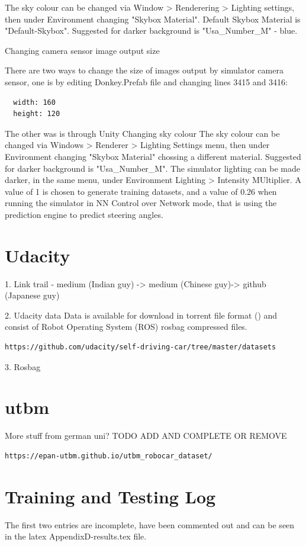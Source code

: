 The sky colour can be changed via Window > Renderering > Lighting settings, then under Environment changing "Skybox Material". Default Skybox Material is "Default-Skybox". Suggested for darker background is "Usa\_Number\_M" - blue.

Changing camera sensor image output size

There are two ways to change the size of images output by simulator camera sensor, one is by editing Donkey.Prefab file and changing lines 3415 and 3416:
\begin{verbatim}
  width: 160
  height: 120
\end{verbatim}
The other was is through Unity
Changing sky colour
The sky colour can be changed via Windows > Renderer > Lighting Settings menu, then under Environment changing "Skybox Material" chossing a different material.  Suggested for darker background is "Usa\_Number\_M".
The simulator lighting can be made darker, in the same menu, under Environment Lighting > Intensity MUltiplier. A value of 1 is chosen to generate training datasets, and a value of 0.26 when running the simulator in NN Control over Network mode, that is using the prediction engine to predict steering angles.
\section{Udacity}

1. Link trail - medium (Indian guy) -> medium (Chinese guy)-> github (Japanese guy)  
  
2. Udacity data  
Data is available for download in torrent file format (\cite{torrentCite}) and consist of Robot Operating System (ROS) rosbag compressed files.

\begin{verbatim}
https://github.com/udacity/self-driving-car/tree/master/datasets
\end{verbatim}
3. Rosbag

\section{utbm}
More stuff from german uni? TODO ADD AND COMPLETE OR REMOVE
\begin{verbatim}
https://epan-utbm.github.io/utbm_robocar_dataset/
\end{verbatim}

\section{Training and Testing Log}
\label{res:training_and_testing_log}
The first two entries are incomplete, have been commented out and can be seen in the latex AppendixD-results.tex file.

